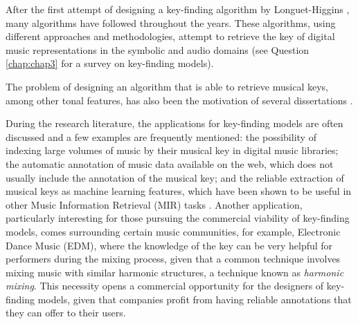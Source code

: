



After the first attempt of designing a key-finding algorithm by Longuet-Higgins \cite{longuet-higgins_interpreting_1971}, many algorithms have followed throughout the years. These algorithms, using different approaches and methodologies, attempt to retrieve the key of digital music representations in the symbolic and audio domains (see Question \ref{chap:chap3} for a survey on key-finding models). 

The problem of designing an algorithm that is able to retrieve musical keys, among other tonal features, has also been the motivation of several dissertations \cite{gomez_tonal_2006, campbell_automatic_2010, korzeniowski_harmonic_2018, sapp_computational_2011, chew_towards_2000}. 

During the research literature, the applications for key-finding models are often discussed and a few examples are frequently mentioned: the possibility of indexing large volumes of music by their musical key in digital music libraries; the automatic annotation of music data available on the web, which does not usually include the annotation of the musical key; and the reliable extraction of musical keys as machine learning features, which have been shown to be useful in other Music Information Retrieval (MIR) tasks \cite{mauch_approximate_2010, chai_detection_2005}. Another application, particularly interesting for those pursuing the commercial viability of key-finding models, comes surrounding certain music communities, for example, Electronic Dance Music (EDM), where the knowledge of the key can be very helpful for performers during the mixing process, given that a common technique involves mixing music with similar harmonic structures, a technique known as \emph{harmonic mixing}. This necessity opens a commercial opportunity for the designers of key-finding models, given that companies profit from having reliable annotations that they can offer to their users. 

